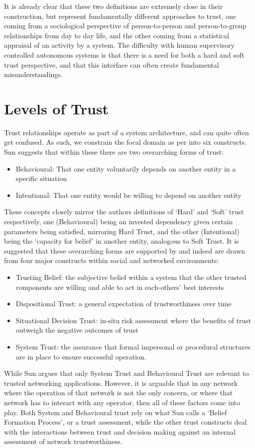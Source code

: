 It is already clear that these two definitions are extremely close in their construction, but represent fundamentally different approaches to trust, one coming from a sociological perspective of person-to-person and person-to-group relationships from day to day life, and the other coming from a statistical appraisal of an activity by a system.
The difficulty with human supervisory controlled autonomous systems is that there is a need for both a hard and soft trust perspective, and that this interface can often create fundamental misunderstandings.


\section{Levels of Trust}
Trust relationships operate as part of a system architecture, and can quite often get confused.
As such, we constrain the focal domain as per \cite{Liu2006} into six constructs.
Sun\cite{Sun2008} suggests that within these there are two overarching forms of trust:
\begin{itemize}
  \item Behavioural: That one entity voluntarily depends on another entity in a specific situation
  \item Intentional: That one entity would be willing to depend on another entity
\end{itemize}

These concepts closely mirror the authors definitions of ‘Hard’ and ‘Soft’ trust respectively, one (Behavioural) being an invested dependency given certain parameters being satisfied, mirroring Hard Trust, and the other (Intentional) being the ‘capacity for belief’ in another entity, analogous to Soft Trust.
It is suggested that these overarching forms are supported by and indeed are drawn from four major constructs within social and networked environments:
\begin{itemize}
  \item Trusting Belief: the subjective belief within a system that the other trusted components are willing and able to act in each-others’ best interests
  \item Dispositional Trust: a general expectation of trustworthiness over time 
  \item Situational Decision Trust: in-situ risk assessment where the benefits of trust outweigh the negative outcomes of trust
  \item System Trust: the assurance that formal impersonal or procedural structures are in place to ensure successful operation.
\end{itemize}
While Sun argues that only System Trust and Behavioural Trust are relevant to trusted networking applications.
However, it is arguable that in any network where the operation of that network is not the only concern, or where that network has to interact with any operator, then all of these factors come into play.
Both System and Behavioural trust rely on what Sun calls a ‘Belief Formation Process’, or a trust assessment, while the other trust constructs deal with the interactions between trust and decision making against an internal assessment of network trustworthiness.

